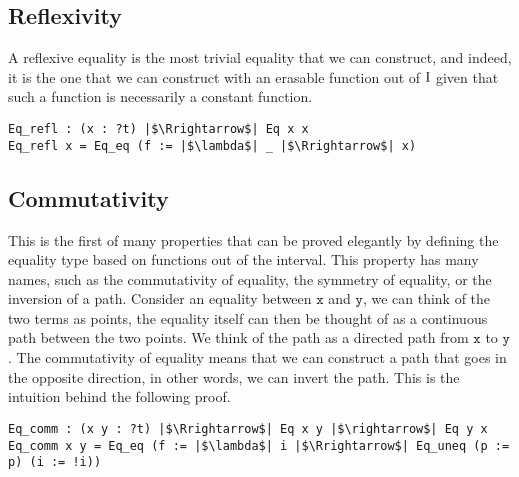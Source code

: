 \documentclass[12pt,twoside,maitrise]{dms}
\theoremstyle{definition}
\numberwithin{equation}{section}
\numberwithin{table}{chapter}
\numberwithin{figure}{chapter}
\newcommand\id[1] {\texttt{#1}}
\begin{document}
\subsection*{Reflexivity}
A reflexive equality is the most trivial equality that we can construct, and
indeed, it is the one that we can construct with an erasable function out of
$\mathrm{I}$ given that such a function is necessarily a constant function.

\begin{verbatim}
Eq_refl : (x : ?t) |$\Rrightarrow$| Eq x x
Eq_refl x = Eq_eq (f := |$\lambda$| _ |$\Rrightarrow$| x)
\end{verbatim}

\subsection*{Commutativity}
This is the first of many properties that can be proved elegantly by defining
the equality type based on functions out of the interval. This property has many
names, such as the commutativity of equality, the symmetry of equality, or the
inversion of a path. Consider an equality between $\id{x}$ and $\id{y}$, we can
think of the two terms as points, the equality itself can then be thought of as
a continuous path between the two points. We think of the path as a directed
path from $\id{x}$ to $\id{y}$. The commutativity of equality means that we can
construct a path that goes in the opposite direction, in other words, we can
invert the path. This is the intuition behind the following proof.

\begin{verbatim}
Eq_comm : (x y : ?t) |$\Rrightarrow$| Eq x y |$\rightarrow$| Eq y x
Eq_comm x y = Eq_eq (f := |$\lambda$| i |$\Rrightarrow$| Eq_uneq (p := p) (i := !i))
\end{verbatim}
\end{document}
